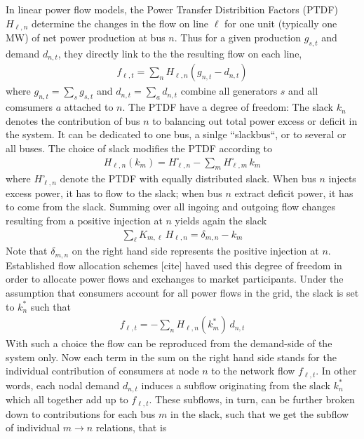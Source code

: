 \documentclass[11pt,twocolumn]{article}
\newcommand{\generation}{g_{s,t}}
\newcommand{\nodalgeneration}[1][n]{g_{#1,t}}
\newcommand{\demand}[1][n]{d_{#1,t}}
\newcommand{\nodaldemand}[1][n]{d_{#1,t}}
\newcommand{\incidence}[1][n]{K_{#1,\ell}}
\newcommand{\ptdf}[1][n]{H_{\ell,#1}}
\newcommand{\ptdfEqual}[1][n]{\ptdf[#1]^\circ}
\newcommand{\slack}[1][n]{k_{#1}}
\newcommand{\slackk}[1][n]{k^*_{#1}}
\newcommand{\flow}{f_{\ell,t}}
\begin{document}
In linear power flow models, the Power Transfer Distribition Factors (PTDF) $\ptdf$ determine the changes in the flow on line $\ell$ for one unit (typically one MW) of net power production at bus $n$. Thus for a given production $\generation$ and demand $\demand$, they directly link to the the resulting flow on each line, 
\begin{align}
\flow  =   \sum_n \ptdf  \left( \nodalgeneration- \nodaldemand \right)    
\label{eq:flow_from_ptdf}
\end{align}
where $\nodalgeneration = \sum_s \generation$ and $\nodaldemand = \sum_a \demand$ combine all generators $s$ and all comsumers $a$ attached to $n$.
The PTDF have a degree of freedom: The slack $\slack$ denotes the contribution of bus $n$ to balancing out total power excess or deficit in the system. It can be dedicated to one bus, a sinlge ``slackbus``, or to several or all buses. The choice of slack modifies the PTDF according to 
\begin{align}
\ptdf\left( \slack[m]\right)  = \ptdfEqual - \sum_m \ptdfEqual[m]  \, \slack[m]
\label{eq:ptdf_slacked}
\end{align}
where $\ptdfEqual$ denote the PTDF with equally distributed slack.
When bus $n$ injects excess power, it has to flow to the slack; when bus $n$ extract deficit power, it has to come from the slack. Summing over all ingoing and outgoing flow changes resulting from a positive injection at $n$ yields again the slack 
\begin{align}
\sum_\ell \incidence[m] \, \ptdf =  \delta_{m,n} - \slack[m] 
\label{eq:slack}
\end{align}
Note that $\delta_{m,n}$ on the right hand side represents the positive injection at $n$.
Established flow allocation schemes [cite] haved used this degree of freedom in order to allocate power flows and exchanges to market participants. Under the assumption that consumers account for all power flows in the grid, the slack is set to $\slack^*$ such that 
\begin{align}
\flow  = - \sum_n \ptdf\left( \slackk[m]\right) \, \nodaldemand  
\label{eq:flow_from_demand}
\end{align}
With such a choice the flow can be reproduced from the demand-side of the system only. Now each term in the sum on the right hand side stands for the individual contribution of consumers at node $n$ to the network flow $\flow$. In other words, each nodal demand $\nodaldemand$ induces a subflow originating from the slack $\slackk$ which all together add up to $\flow$. These subflows, in turn, can be further broken down to contributions for each bus $m$ in the slack, such that we get the subflow of individual $m \rightarrow n$ relations, that is 
\end{document}
